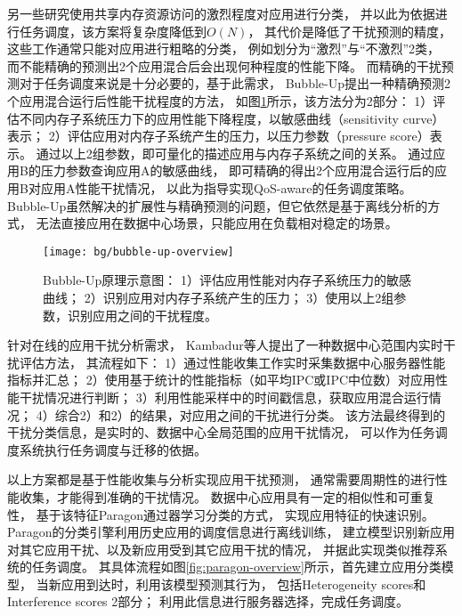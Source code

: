 另一些研究使用共享内存资源访问的激烈程度对应用进行分类，
并以此为依据进行任务调度\cite{Chandra:2005, Knauerhase:2008, mars_contention_2010,
Zhuravlev:2010}，该方案将复杂度降低到$O(N)$，
其代价是降低了干扰预测的精度，这些工作通常只能对应用进行粗略的分类，
例如划分为``激烈''与``不激烈''2类，
而不能精确的预测出2个应用混合后会出现何种程度的性能下降。
而精确的干扰预测对于任务调度来说是十分必要的，基于此需求，
Bubble-Up\cite{mars_bubble-up:_2011}提出一种精确预测2个应用混合运行后性能干扰程度的方法，
如图\ref{fig:bubble-up-overview}所示，该方法分为2部分：
1）评估不同内存子系统压力下的应用性能下降程度，以敏感曲线（sensitivity curve）表示；
2）评估应用对内存子系统产生的压力，以压力参数（pressure score）表示。
通过以上2组参数，即可量化的描述应用与内存子系统之间的关系。
通过应用B的压力参数查询应用A的敏感曲线，
即可精确的得出2个应用混合运行后的应用B对应用A性能干扰情况，
以此为指导实现QoS-aware的任务调度策略。
Bubble-Up虽然解决的扩展性与精确预测的问题，但它依然是基于离线分析的方式，
无法直接应用在数据中心场景，只能应用在负载相对稳定的场景。

\begin{figure}[tb]
  \centering
  \texttt{[image: bg/bubble-up-overview]}
  \caption[BubbleUp原理示意图]{
    Bubble-Up\cite{mars_bubble-up:_2011}原理示意图：
    1）评估应用性能对内存子系统压力的敏感曲线；
    2）识别应用对内存子系统产生的压力；
    3）使用以上2组参数，识别应用之间的干扰程度。}
  \label{fig:bubble-up-overview}
\end{figure}

针对在线的应用干扰分析需求，
Kambadur等人提出了一种数据中心范围内实时干扰评估方法\cite{kambadur_measuring_2012}，
其流程如下：
1）通过性能收集工作实时采集数据中心服务器性能指标并汇总；
2）使用基于统计的性能指标（如平均IPC或IPC中位数）对应用性能干扰情况进行判断；
3）利用性能采样中的时间戳信息，获取应用混合运行情况；
4）综合2）和2）的结果，对应用之间的干扰进行分类。
该方法最终得到的干扰分类信息，是实时的、数据中心全局范围的应用干扰情况，
可以作为任务调度系统执行任务调度与迁移的依据。

以上方案都是基于性能收集与分析实现应用干扰预测，
通常需要周期性的进行性能收集，才能得到准确的干扰情况。
数据中心应用具有一定的相似性和可重复性，
基于该特征Paragon\cite{delimitrou_paragon:_2013}通过器学习分类的方式，
实现应用特征的快速识别。
Paragon的分类引擎利用历史应用的调度信息进行离线训练，
建立模型识别新应用对其它应用干扰、以及新应用受到其它应用干扰的情况，
并据此实现类似推荐系统的任务调度。
其具体流程如图\ref{fig:paragon-overview}所示，首先建立应用分类模型，
当新应用到达时，利用该模型预测其行为，
包括Heterogeneity scores和Interference scores 2部分；
利用此信息进行服务器选择，完成任务调度。

